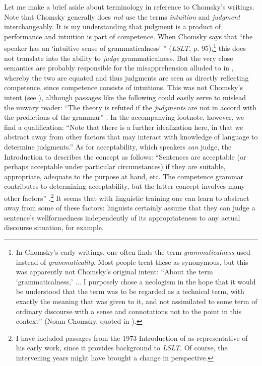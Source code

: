Let me make a brief aside about terminology in reference to Chomsky's writings. Note that Chomsky generally does \textit{not} use the terms \textit{intuition} and \textit{judgment} interchangeably. It is my understanding that judgment is a product of performance and intuition is part of competence. When Chomsky says that ``the speaker has an `intuitive sense of grammaticalness' '' (\textit{LSLT}, p. 95),\footnote{In Chomsky's early writings, one often finds the term \textit{grammaticalness} used instead of \textit{grammaticality}. Most people treat these as synonymous, but this was apparently not Chomsky's original intent: ``About the term `grammaticalness,' ... I purposely chose a neologism in the hope that it would be understood that the term was to be regarded as a technical term, with exactly the meaning that was given to it, and not assimilated to some term of ordinary discourse with a sense and connotations not to the point in this context'' (Noam Chomsky, quoted in \citet[14]{Paikeday1985}).
}
this does not translate into the ability to \textit{judge} grammaticalness. But the very close semantics are probably responsible for the misapprehension alluded to in , whereby the two are equated and thus judgments are seen as directly reflecting competence, since competence consists of intuitions. This was not Chomsky's intent (see \citet[21]{Chomsky1965}), although passages like the following could easily serve to mislead the unwary reader: ``The theory is refuted if the \textit{judgments} are not in accord with the predictions of the grammar'' \citep[36]{Chomsky1985}. In the accompanying footnote, however, we find a qualification: ``Note that there is a further idealization here, in that we abstract away from other factors that may interact with knowledge of language to determine judgments.'' As for acceptability, which speakers \textit{can} judge, the Introduction to \citet{Chomsky1985} describes the concept as follows: ``Sentences are acceptable (or perhaps acceptable under particular circumstances) if they are suitable, appropriate, adequate to the purpose at hand, etc. The competence grammar contributes to determining acceptability, but the latter concept involves many other factors'' \citep[8]{Chomsky1985}.\footnote{I have included passages from the 1973 Introduction of \citet{Chomsky1985} as representative of his early work, since it provides background to \textit{LSLT}. Of course, the intervening years might have brought a change in perspective.}
It seems that with linguistic training one can learn to abstract away from some of these factors: linguists certainly assume that they can judge a sentence's wellformedness independently of its appropriateness to any actual discourse situation, for example.
 
